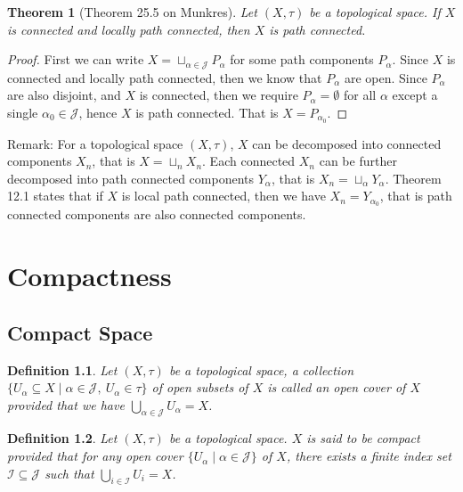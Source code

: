 \documentclass[11pt]{book}
\theoremstyle{break}
\theoremstyle{break}
\newtheorem{thm}{Theorem}[section]
\newtheorem{defn}{Definition}[corL]
\newcommand{\remark}{\color{blue}Remark: \color{black}}
\begin{document}
\begin{thm}[Theorem 25.5 on Munkres]
Let $(X,\tau)$ be a topological space. If $X$ is connected and locally path connected, then $X$ is path connected. 
\end{thm}
\begin{proof}
First we can write $X = \sqcup_{\alpha \in \mathcal{J}}P_\alpha$ for some path components $P_\alpha$. Since $X$ is connected and locally path connected, then we know that $P_\alpha$ are open. Since $P_\alpha $ are also disjoint, and $X$ is connected, then we require $P_\alpha = \emptyset$ for all $\alpha$ except a single $\alpha_0 \in \mathcal{J}$, hence $X$ is path connected. That is $X = P_{\alpha_0}$. 
\end{proof}



\remark For a topological space $(X,\tau)$, $X$ can be decomposed into connected components $X_n$, that is $X= \sqcup_{n}X_n$. Each connected $X_n$ can be further decomposed into path connected components $Y_\alpha$, that is $X_n = \sqcup_\alpha Y_\alpha$. Theorem 12.1 states that if $X$ is local path connected, then we have $X_n = Y_{\alpha_0}$, that is path connected components are also connected components. 


\newpage
\chapter{Compactness}
\setcounter{section}{12}

\section[Compact Spaces]{\color{red}Compact Space\color{black}}
\begin{defn}
Let $(X,\tau)$ be a topological space, a collection $\{U_\alpha\subseteq X \mid \alpha \in \mathcal{J}, \ U_\alpha \in \tau\}$ of open subsets of $X$ is called an open cover of $X$ provided that we have $\bigcup_{\alpha \in \mathcal{J}}U_\alpha = X$. 
\end{defn}

\begin{defn}
Let $(X,\tau)$ be a topological space. $X$ is said to be compact provided that for any open cover $\{U_\alpha \mid \alpha \in \mathcal{J}\}$ of $X$, there exists a finite index set $\mathcal{I} \subseteq \mathcal{J}$ such that $\bigcup_{i \in \mathcal{I}}U_i = X$. 
\end{defn}
\end{document}
